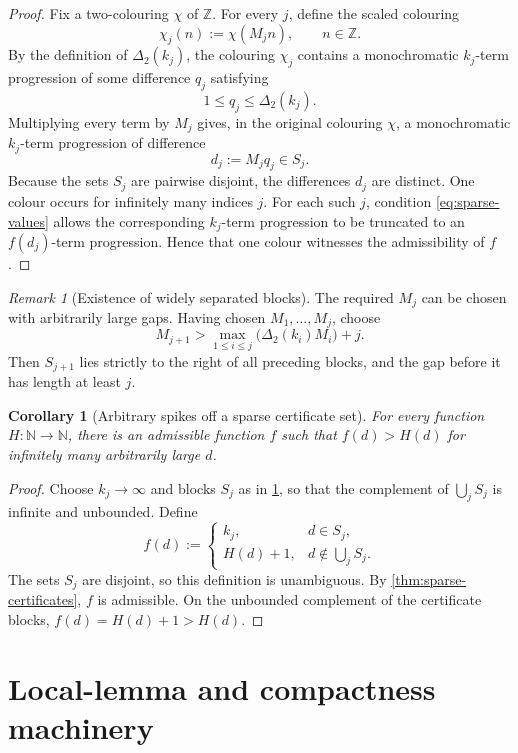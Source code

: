 \documentclass[11pt]{article}
\newtheorem{corollary}[theorem]{Corollary}
\theoremstyle{definition}
\theoremstyle{remark}
\newtheorem{remark}[theorem]{Remark}
\newcommand{\N}{\mathbb N}
\newcommand{\Z}{\mathbb Z}
\newcommand{\DeltaTwo}{\Delta_{2}}
\newcommand{\col}{\chi}
\begin{document}
\begin{proof}
Fix a two-colouring $\col$ of $\Z$. For every $j$, define the scaled colouring
\[
\col_j(n):=\col(M_jn),\qquad n\in\Z.
\]
By the definition of $\DeltaTwo(k_j)$, the colouring $\col_j$ contains a monochromatic $k_j$-term progression of some difference $q_j$ satisfying
\[
1\le q_j\le\DeltaTwo(k_j).
\]
Multiplying every term by $M_j$ gives, in the original colouring $\col$, a monochromatic $k_j$-term progression of difference
\[
d_j:=M_jq_j\in S_j.
\]
Because the sets $S_j$ are pairwise disjoint, the differences $d_j$ are distinct. One colour occurs for infinitely many indices $j$. For each such $j$, condition \eqref{eq:sparse-values} allows the corresponding $k_j$-term progression to be truncated to an $f(d_j)$-term progression. Hence that one colour witnesses the admissibility of $f$.
\end{proof}

\begin{remark}[Existence of widely separated blocks]\label{rem:blocks}
The required $M_j$ can be chosen with arbitrarily large gaps. Having chosen $M_1,\ldots,M_j$, choose
\[
M_{j+1}>
\max_{1\le i\le j}\bigl(\DeltaTwo(k_i)M_i\bigr)+j.
\]
Then $S_{j+1}$ lies strictly to the right of all preceding blocks, and the gap before it has length at least $j$.
\end{remark}

\begin{corollary}[Arbitrary spikes off a sparse certificate set]\label{cor:arbitrary-spikes}
For every function $H\colon\N\to\N$, there is an admissible function $f$ such that $f(d)>H(d)$ for infinitely many arbitrarily large $d$.
\end{corollary}

\begin{proof}
Choose $k_j\to\infty$ and blocks $S_j$ as in \cref{rem:blocks}, so that the complement of $\bigcup_jS_j$ is infinite and unbounded. Define
\[
f(d):=
\begin{cases}
k_j,&d\in S_j,\\
H(d)+1,&d\notin\bigcup_jS_j.
\end{cases}
\]
The sets $S_j$ are disjoint, so this definition is unambiguous. By \cref{thm:sparse-certificates}, $f$ is admissible. On the unbounded complement of the certificate blocks, $f(d)=H(d)+1>H(d)$.
\end{proof}

\section{Local-lemma and compactness machinery}
\end{document}
